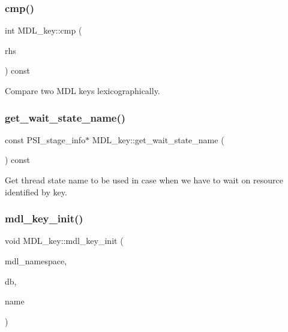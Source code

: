\subsubsection{\texorpdfstring{cmp()}{cmp()}}
{\footnotesize\ttfamily int M\+D\+L\+\_\+key\+::cmp (\begin{DoxyParamCaption}\item[{const \mbox{\hyperlink{structMDL__key}{M\+D\+L\+\_\+key}} $\ast$}]{rhs }\end{DoxyParamCaption}) const\hspace{0.3cm}{\ttfamily [inline]}}

Compare two M\+DL keys lexicographically. \mbox{\label{structMDL__key_ac6f4051535fef0ad4f557a551bd1aa77}} 
\subsubsection{\texorpdfstring{get\+\_\+wait\+\_\+state\+\_\+name()}{get\_wait\_state\_name()}}
{\footnotesize\ttfamily const P\+S\+I\+\_\+stage\+\_\+info$\ast$ M\+D\+L\+\_\+key\+::get\+\_\+wait\+\_\+state\+\_\+name (\begin{DoxyParamCaption}{ }\end{DoxyParamCaption}) const\hspace{0.3cm}{\ttfamily [inline]}}

Get thread state name to be used in case when we have to wait on resource identified by key. \mbox{\label{structMDL__key_a3815fd610e5670602ecffd82b695d1e7}} 
\subsubsection{\texorpdfstring{mdl\+\_\+key\+\_\+init()}{mdl\_key\_init()}}
{\footnotesize\ttfamily void M\+D\+L\+\_\+key\+::mdl\+\_\+key\+\_\+init (\begin{DoxyParamCaption}\item[{\mbox{\hyperlink{structMDL__key_a391ec4bd98fec6852a48f7856546ed3b}{enum\+\_\+mdl\+\_\+namespace}}}]{mdl\+\_\+namespace,  }\item[{const char $\ast$}]{db,  }\item[{const char $\ast$}]{name }\end{DoxyParamCaption})\hspace{0.3cm}{\ttfamily [inline]}}

